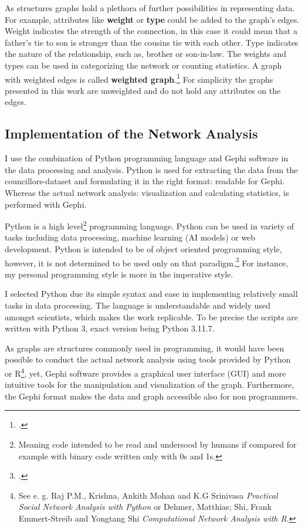 As structures graphs hold a plethora of further possibilities in representing data. For example, attributes like \textbf{weight} or \textbf{type} could be added to the graph's edges. Weight indicates the strength of the connection, in this case it could mean that a father's tie to son is stronger than the cousins tie with each other. Type indicates the nature of the relationship, such as, brother or son-in-law. The weights and types can be used in categorizing the network or counting statistics. A graph with weighted edges is called \textbf{weighted graph}.\footcite[pp. 11-12.]{RajPM2018} For simplicity the graphs presented in this work are unweighted and do not hold any attributes on the edges. 

\subsection{Implementation of the Network Analysis}
I use the combination of Python programming language and Gephi software in the data processing and analysis. Python is used for extracting the data from the councillors-dataset and formulating it in the right format: readable for Gephi. Whereas the actual network analysis: visualization and calculating statistics, is performed with Gephi. 

Python is a high level\footnote{Meaning code intended to be read and undersood by humans if compared for example with binary code written only with 0s and 1s.} programming language. Python can be used in variety of tasks including data processing, machine learning (AI models) or web development. Python is intended to be of object oriented programming style, however, it is not determined to be used only on that paradigm.\footcite[p. 1.]{pythonbook} For instance, my personal programming style is more in the imperative style. 

I selected Python due its simple syntax and ease in implementing relatively small tasks in data processing. The language is understandable and widely used amongst scientists, which makes the work replicable. To be precise the scripts are written with Python 3, exact version being Python 3.11.7.

As graphs are structures commonly used in programming, it would have been possible to conduct the actual network analysis using tools provided by Python or R\footnote{See e. g. Raj P.M., Krishna, Ankith Mohan and K.G Srinivasa \textit{Practical Social Network Analysis with Python} or Dehmer, Matthias; Shi, Frank Emmert-Streib and Yongtang Shi \textit{Computational Network Analysis with R}.}, yet, Gephi software provides a graphical user interface (GUI) and more intuitive tools for the manipulation and visualization of the graph. Furthermore, the Gephi format makes the data and graph accessible also for non programmers.

